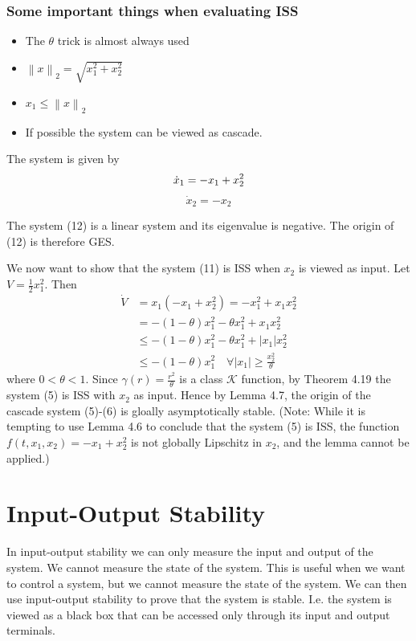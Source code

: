 \documentclass{article}
\begin{document}
\subsubsection{Some important things when evaluating ISS}
\begin{itemize}
	\item The $\theta $ trick is almost always used
	\item $\left\| x \right\|_2 = \sqrt{x_1^{2}+x_2^{2}}$
	\item $x_1 \leq \left\| x \right\|_2$
	\item If possible the system can be viewed as cascade.
\end{itemize}
\begin{frm-ex}
The system is given by
\begin{equation}
	\dot{x}_1=-x_1+x_2^2\\
\end{equation}
\begin{equation}
	\dot{x}_2=-x_2
\end{equation}

The system (12) is a linear system and its eigenvalue is negative. The origin of (12) is therefore GES.

We now want to show that the system (11) is ISS when $x_2$ is viewed as input. Let $V=\frac{1}{2} x_1^2$. Then
$$
	\begin{aligned}
		\dot{V} & =x_1\left(-x_1+x_2^2\right)=-x_1^2+x_1 x_2^2                                  \\
		        & =-(1-\theta) x_1^2-\theta x_1^2+x_1 x_2^2                                     \\
		        & \leq-(1-\theta) x_1^2-\theta x_1^2+\left|x_1\right| x_2^2                     \\
		        & \leq-(1-\theta) x_1^2 \quad \forall\left|x_1\right| \geq \frac{x_2^2}{\theta}
	\end{aligned}
$$
where $0<\theta<1$. Since $\gamma(r)=\frac{r^2}{\theta}$ is a class $\mathcal{K}$ function, by Theorem 4.19 the system (5) is ISS with $x_2$ as input. Hence by Lemma 4.7, the origin of the cascade system (5)-(6) is gloally asymptotically stable.
(Note: While it is tempting to use Lemma 4.6 to conclude that the system (5) is ISS, the function $f\left(t, x_1, x_2\right)=-x_1+x_2^2$ is not globally Lipschitz in $x_2$, and the lemma cannot be applied.)
\end{frm-ex}
\section{Input-Output Stability}
In input-output stability we can only measure the input and output of the system. We cannot measure the state of the system. This is useful when we want to control a system, but we cannot measure the state of the system. We can then use input-output stability to prove that the system is stable. I.e. the system is viewed as a black box that can be accessed only through its input and output terminals.
\end{document}
